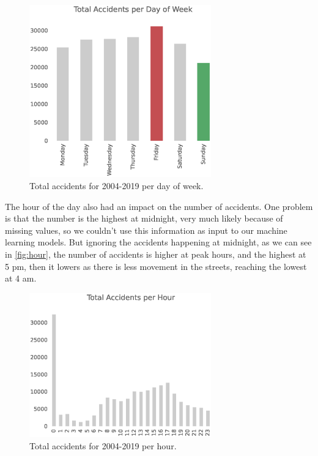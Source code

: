 \documentclass[12pt]{article}
\begin{document}
\begin{figure}
        \centering
        \includegraphics[width=0.7\textwidth]{plot_day_of_week.eps}
        \caption{Total accidents for 2004-2019 per day of week.\label{fig:day_of_week}}
\end{figure}

The hour of the day also had an impact on the number of accidents. One problem is that the number is the highest at midnight, very much likely because of missing values, so we couldn’t use this information as input to our machine learning models. But ignoring the accidents happening at midnight, as we can see in \autoref{fig:hour}, the number of accidents is higher at peak hours, and the highest at 5 pm, then it lowers as there is less movement in the streets, reaching the lowest at 4 am.

\begin{figure}
        \centering
        \includegraphics[width=0.7\textwidth]{plot_hour.eps}
        \caption{Total accidents for 2004-2019 per hour.\label{fig:hour}}
\end{figure}
\end{document}
